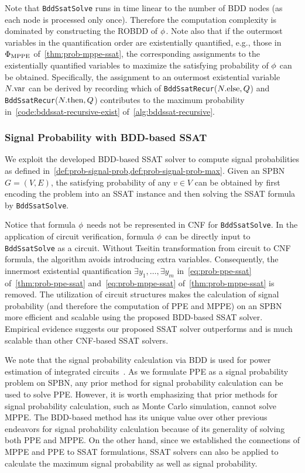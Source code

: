Note that \texttt{BddSsatSolve} runs in time linear to the number of BDD nodes (as each node is processed only once).
Therefore the computation complexity is dominated by constructing the ROBDD of $\phi$.
Note also that if the outermost variables in the quantification order are existentially quantified, e.g.,
those in $\Phi_\mathrm{MPPE}$ of~\cref{thm:prob-mppe-ssat},
the corresponding assignments to the existentially quantified variables
to maximize the satisfying probability of $\phi$ can be obtained.
Specifically,
the assignment to an outermost existential variable $N.\mathrm{var}$ can be derived by recording which of
\texttt{BddSsatRecur}($N.\mathrm{else},Q$) and
\texttt{BddSsatRecur}($N.\mathrm{then},Q$)
contributes to the maximum probability in~\cref{code:bddssat-recursive-exist} of~\cref{alg:bddssat-recursive}.

\subsubsection{Signal Probability with BDD-based SSAT}
We exploit the developed BDD-based SSAT solver to compute signal probabilities as defined in~\cref{def:prob-signal-prob,def:prob-signal-prob-max}.
Given an SPBN $G=(V,E)$,
the satisfying probability of any $v \in V$ can be obtained by first encoding the problem into an SSAT instance
and then solving the SSAT formula by \texttt{BddSsatSolve}.

Notice that formula $\phi$ needs not be represented in CNF for \texttt{BddSsatSolve}.
In the application of circuit verification,
formula $\phi$ can be directly input to \texttt{BddSsatSolve} as a circuit.
Without Tseitin transformation from circuit to CNF formula,
the algorithm avoids introducing extra variables.
Consequently, the innermost existential quantification $\exists y_1,\ldots,\exists y_m$
in~\cref{eq:prob-ppe-ssat} of~\cref{thm:prob-ppe-ssat}
and~\cref{eq:prob-mppe-ssat} of~\cref{thm:prob-mppe-ssat} is removed.
The utilization of circuit structures makes the calculation of signal probability
(and therefore the computation of PPE and MPPE) on an SPBN more efficient and scalable
using the proposed BDD-based SSAT solver.
Empirical evidence suggests our proposed SSAT solver outperforms and is much scalable than other CNF-based SSAT solvers.

We note that the signal probability calculation via BDD is used for power estimation of integrated circuits~\cite{Najm1994}.
As we formulate PPE as a signal probability problem on SPBN,
any prior method for signal probability calculation can be used to solve PPE.
However, it is worth emphasizing that prior methods for signal probability calculation,
such as Monte Carlo simulation, cannot solve MPPE.
The BDD-based method has its unique value over other previous endeavors for signal probability calculation
because of its generality of solving both PPE and MPPE.
On the other hand,
since we established the connections of MPPE and PPE to SSAT formulations,
SSAT solvers can also be applied to calculate the maximum signal probability as well as signal probability.

